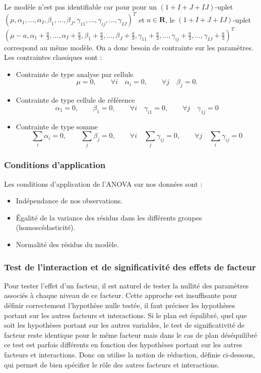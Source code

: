 \documentclass[12pt,a4paper]{report}
\newcommand{\bigbullet}{\ding{108}}
\begin{document}
	Le modèle n'est pas identifiable car pour pour un $(1+I+J+IJ)$-uplet $(\mu,\alpha_1,...,\alpha_I,\beta_1,...,\beta_J,\gamma_{11},...,\gamma_{ij},...,\gamma_{IJ})^T$ et $a \in \mathbf{R}$, le $(1+I+J+IJ)$-uplet $(\mu-a,\alpha_1+\frac{a}{3},...,\alpha_I+\frac{a}{3},\beta_1+\frac{a}{3},...,\beta_J+\frac{a}{3},\gamma_{11}+\frac{a}{3},...,\gamma_{ij}+\frac{a}{3},...,\gamma_{IJ}+\frac{a}{3})^T$ correspond au même modèle. On a donc besoin de contrainte sur les paramètres. Les contraintes classiques sont : 
	\begin{itemize}
		\item Contrainte de type analyse par cellule
		\begin{equation}
			\mu=0,\quad\quad \forall i \quad  \alpha_i=0, \quad\quad \forall  j  \quad \beta_j=0.
		\end{equation}
		\item Contrainte de type cellule de référence
		\begin{equation}
			\alpha_1=0,\quad\quad \beta_1=0,\quad\quad \forall i\quad \gamma_{i1}=0,\quad\quad \forall j \quad \gamma_{1j}=0
		\end{equation}
		\item Contrainte de type somme
		\begin{equation}
			\sum_{i}\alpha_i=0,\quad\quad\sum_{j}\beta_j=0,\quad\quad\forall i \quad \sum_{j}\gamma_{ij}=0,\quad\quad\forall j \quad\sum_{i}\gamma_{ij}=0
		\end{equation}
	\end{itemize}
	\subsubsection{Conditions d'application}
	Les conditions d'application de l'ANOVA sur nos données sont : 
	\begin{itemize}
		\item[\bigbullet] Indépendance de nos observations.
		\item[\bigbullet] Égalité de la variance des résidus dans les différents groupes (homoscédasticité).
		\item[\bigbullet] Normalité des résidus du modèle.
	\end{itemize}
	
	\subsubsection{Test de l'interaction et de significativité des effets de facteur}
	Pour tester l'effet d'un facteur, il est naturel de tester la nullité des paramètres associés à chaque niveau de ce facteur. Cette approche est insuffisante pour définir correctement l'hypothèse nulle testée, il faut préciser les hypothèses portant sur les autres facteurs et interactions. Si le plan est équilibré, quel que soit les hypothèses portant sur les autres variables, le test de significativité de facteur reste identique pour le même facteur mais dans le cas de plan déséquilibré ce test est parfois différents en fonction des hypothèses portant sur les autres facteurs et interactions. Donc on utilise la notion de réduction, définie ci-dessous, qui permet de bien spécifier le rôle des autres facteurs et interactions.\\
	
\end{document}
